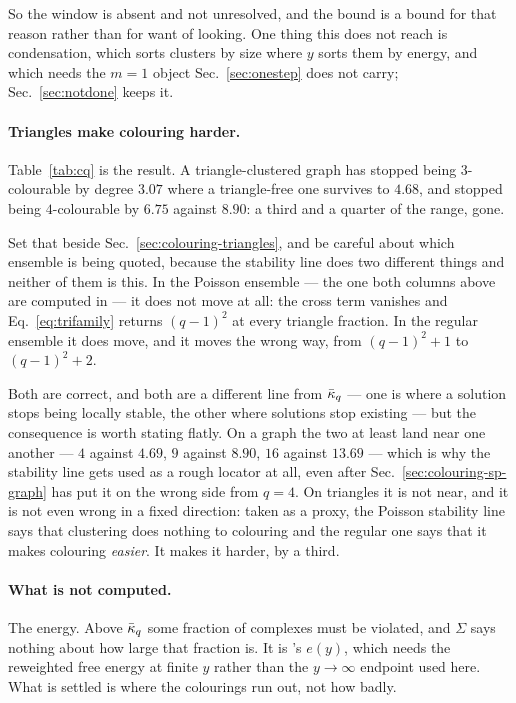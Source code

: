 So the window is absent and not unresolved, and the bound is a bound for that
reason rather than for want of looking. One thing this does not reach is
condensation, which sorts clusters by size where $y$ sorts them by energy, and
which needs the $m=1$ object Sec.~\ref{sec:onestep} does not carry;
Sec.~\ref{sec:notdone} keeps it.



\paragraph{Triangles make colouring harder.} Table~\ref{tab:cq} is the result.
A triangle-clustered graph has stopped being $3$-colourable by degree $3.07$
where a triangle-free one survives to $4.68$, and stopped being $4$-colourable
by $6.75$ against $8.90$: a third and a quarter of the range, gone.

Set that beside Sec.~\ref{sec:colouring-triangles}, and be careful about which
ensemble is being quoted, because the stability line does two different things
and neither of them is this. In the Poisson ensemble --- the one both columns
above are computed in --- it does not move at all: the cross term vanishes and
Eq.~\eqref{eq:trifamily} returns $(q-1)^{2}$ at every triangle fraction. In the
regular ensemble it does move, and it moves the wrong way, from $(q-1)^{2}+1$ to
$(q-1)^{2}+2$.

Both are correct, and both are a different line from $\bar\kappa_{q}$ --- one is where a
solution stops being locally stable, the other where solutions stop existing ---
but the consequence is worth stating flatly. On a graph the two at least land
near one another --- $4$ against $4.69$, $9$ against $8.90$, $16$ against
$13.69$ --- which is why the stability line gets used as a rough locator at all,
even after Sec.~\ref{sec:colouring-sp-graph} has put it on the wrong side from $q=4$.
On triangles it is not near, and it is not even wrong in a fixed direction:
taken as a proxy, the Poisson stability line says that clustering does nothing
to colouring and the regular one says that it makes colouring \emph{easier}. It
makes it harder, by a third.

\paragraph{What is not computed.} The energy. Above $\bar\kappa_{q}$ some fraction of
complexes must be violated, and $\Sigma$ says nothing about how large that
fraction is. It is \citeauthor{krzakala2004}'s $e(y)$, which needs the
reweighted free energy at finite $y$ rather than the $y\to\infty$ endpoint used
here. What is settled is where the colourings run out, not how badly.

